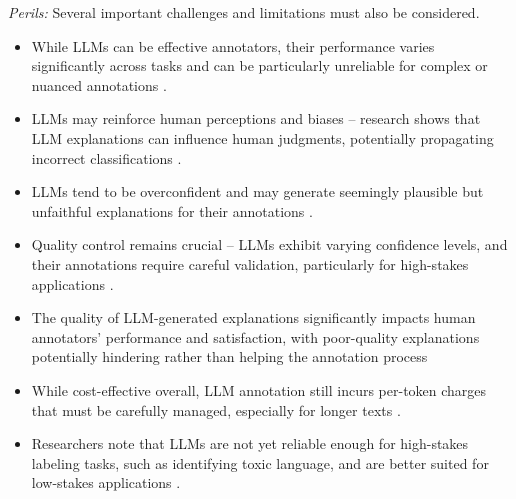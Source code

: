\documentclass[11pt]{article}
\begin{document}
\emph{Perils:} Several important challenges and limitations must also be considered. 
\begin{itemize}
    \item While LLMs can be effective annotators, their performance varies significantly across tasks and can be particularly unreliable for complex or nuanced annotations \cite{DBLP:conf/www/HuangKA23a,DBLP:conf/chi/Wang0RMM24}. 
    \item LLMs may reinforce human perceptions and biases -- research shows that LLM explanations can influence human judgments, potentially propagating incorrect classifications \cite{DBLP:conf/www/HuangKA23a}. 
    \item  LLMs tend to be overconfident and may generate seemingly plausible but unfaithful explanations for their annotations \cite{DBLP:conf/kdd/WanSJKCNSSWYABJ24}.
    \item Quality control remains crucial -- LLMs exhibit varying confidence levels, and their annotations require careful validation, particularly for high-stakes applications \cite{DBLP:conf/emnlp/WangLXZZ21}. 
    \item The quality of LLM-generated explanations significantly impacts human annotators' performance and satisfaction, with poor-quality explanations potentially hindering rather than helping the annotation process \cite{DBLP:conf/chi/Wang0RMM24}
    \item While cost-effective overall, LLM annotation still incurs per-token charges that must be carefully managed, especially for longer texts \cite{DBLP:conf/emnlp/WangLXZZ21}. 
    \item Researchers note that LLMs are not yet reliable enough for high-stakes labeling tasks, such as identifying toxic language, and are better suited for low-stakes applications \cite{DBLP:conf/emnlp/WangLXZZ21}.
\end{itemize}
\end{document}
